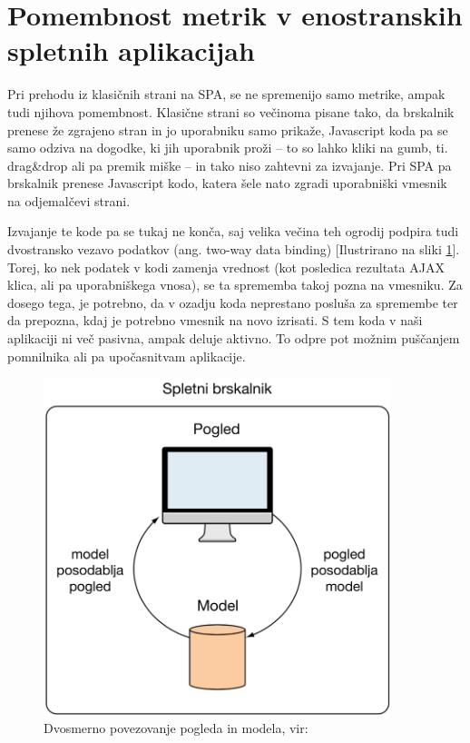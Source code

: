\documentclass[a4paper, 12pt]{book}
\begin{document}
\section{Pomembnost metrik v enostranskih spletnih aplikacijah}

Pri prehodu iz klasičnih strani na SPA, se ne spremenijo samo metrike, ampak tudi njihova pomembnost. Klasične strani so večinoma pisane tako, da brskalnik prenese že zgrajeno stran in jo uporabniku samo prikaže, Javascript koda pa se samo odziva na dogodke, ki jih uporabnik proži – to so lahko kliki na gumb, ti. drag\&drop ali pa premik miške – in tako niso zahtevni za izvajanje. Pri SPA pa brskalnik prenese Javascript kodo, katera šele nato zgradi uporabniški vmesnik na odjemalčevi strani.

Izvajanje te kode pa se tukaj ne konča, saj velika večina teh ogrodij podpira tudi dvostransko vezavo podatkov (ang. two-way data binding) [Ilustrirano na sliki \ref{img:angularjs_two_way_databind}]. Torej, ko nek podatek v kodi zamenja vrednost (kot posledica rezultata AJAX klica, ali pa uporabniškega vnosa), se ta sprememba takoj pozna na vmesniku. Za dosego tega, je potrebno, da v ozadju koda neprestano posluša za spremembe ter da prepozna, kdaj je potrebno vmesnik na novo izrisati. S tem koda v naši aplikaciji ni več pasivna, ampak deluje aktivno. To odpre pot možnim puščanjem pomnilnika ali pa upočasnitvam aplikacije.

\begin{figure}[h]
	\begin{center}
		\includegraphics[width=0.9\textwidth]{AngularJS_dvosmerno_povezovanje.png}
	\end{center}
	\caption{Dvosmerno povezovanje pogleda in modela, vir: \cite{sp_skripta}}
	\label{img:angularjs_two_way_databind}
\end{figure}
\end{document}
